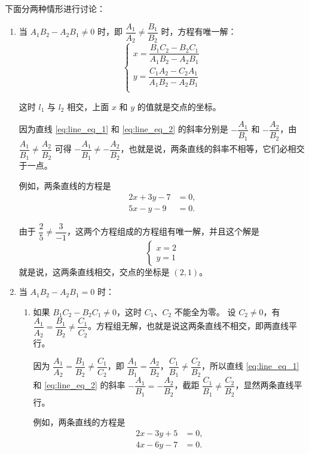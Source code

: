 下面分两种情形进行讨论：
\begin{enumerate}
  \item 当 $A_1B_2-A_2B_1\neq 0$ 时，即 $\dfrac{A_1}{A_2} \neq \dfrac{B_1}{B_2}$ 时，方程有唯一解：
  \[ \begin{cases}
    x=\dfrac{B_1C_2-B_2C_1}{A_1B_2-A_2B_1}\\[10pt]
    y=\dfrac{C_1A_2-C_2A_1}{A_1B_2-A_2B_1}\\
  \end{cases}\]

  这时 $l_1$ 与 $l_2$ 相交，上面 $x$ 和 $y$ 的值就是交点的坐标。

  \medskip 因为直线 \eqref{eq:line_eq_1} 和 \eqref{eq:line_eq_2} 的斜率分别是 $-\dfrac{A_1}{B_1}$ 和 $-\dfrac{A_2}{B_2}$，由 $\dfrac{A_1}{B_1} \neq \dfrac{A_2}{B_2}$ 可得 $-\dfrac{A_1}{B_1}\neq -\dfrac{A_2}{B_2}$，也就是说，两条直线的斜率不相等，它们必相交于一点。

\medskip 例如，两条直线的方程是
\begin{align*}
  2x+3y-7 & = 0,\\
  5x-y-9 & = 0.
\end{align*}

由于 $\dfrac{2}{5} \neq \dfrac{3}{-1}$，这两个方程组成的方程组有唯一解，并且这个解是
\[\begin{cases}x=2\\y=1\end{cases}\]
就是说，这两条直线相交，交点的坐标是 $(2,1)$。

  \item 当 $A_1B_2-A_2B_1= 0$ 时：
  \begin{enumerate}
    \item 如果 $B_1C_2-B_2C_1\neq 0$，这时 $C_1$、$C_2$ 不能全为零。
    设 $C_2\neq 0$，有 $\dfrac{A_1}{A_2}=\dfrac{B_1}{B_2} \neq \dfrac{C_1}{C_2}$。方程组无解，也就是说这两条直线不相交，即两直线平行。

    \medskip 因为 $\dfrac{A_1}{A_2}=\dfrac{B_1}{B_2}\neq\dfrac{C_1}{C_2}$，即 $\dfrac{A_1}{B_1}=\dfrac{A_2}{B_2}$，$\dfrac{C_1}{B_1} \neq \dfrac{C_2}{B_2}$，所以直线 \eqref{eq:line_eq_1} 和 \eqref{eq:line_eq_2} 的斜率 $-\dfrac{A_1}{B_1}=- \dfrac{A_2}{B_2}$，截距 $\dfrac{C_1}{B_1} \neq \dfrac{C_2}{B_2}$，显然两条直线平行。

    \medskip 例如，两条直线的方程是
    \begin{align*}
      2x-3y+5 & = 0,\\
      4x-6y-7 & = 0.
    \end{align*}


\end{enumerate}
\end{enumerate}

